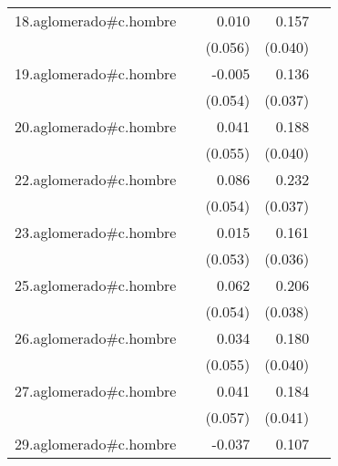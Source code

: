 {\begin{longtable}{l*{4}{D{.}{.}{-1}}}
\addlinespace
18.aglomerado#c.hombre&                     &       0.010         &       0.157\sym{***}&                     \\
            &                     &     (0.056)         &     (0.040)         &                     \\
\addlinespace
19.aglomerado#c.hombre&                     &      -0.005         &       0.136\sym{***}&                     \\
            &                     &     (0.054)         &     (0.037)         &                     \\
\addlinespace
20.aglomerado#c.hombre&                     &       0.041         &       0.188\sym{***}&                     \\
            &                     &     (0.055)         &     (0.040)         &                     \\
\addlinespace
22.aglomerado#c.hombre&                     &       0.086         &       0.232\sym{***}&                     \\
            &                     &     (0.054)         &     (0.037)         &                     \\
\addlinespace
23.aglomerado#c.hombre&                     &       0.015         &       0.161\sym{***}&                     \\
            &                     &     (0.053)         &     (0.036)         &                     \\
\addlinespace
25.aglomerado#c.hombre&                     &       0.062         &       0.206\sym{***}&                     \\
            &                     &     (0.054)         &     (0.038)         &                     \\
\addlinespace
26.aglomerado#c.hombre&                     &       0.034         &       0.180\sym{***}&                     \\
            &                     &     (0.055)         &     (0.040)         &                     \\
\addlinespace
27.aglomerado#c.hombre&                     &       0.041         &       0.184\sym{***}&                     \\
            &                     &     (0.057)         &     (0.041)         &                     \\
\addlinespace
29.aglomerado#c.hombre&                     &      -0.037         &       0.107\sym{**} &                     \\

\end{longtable}}
